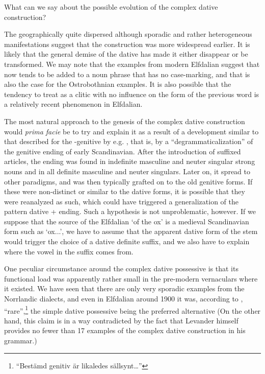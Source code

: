 What can we say about the possible evolution of the complex dative construction? 

The geographically quite dispersed although sporadic and rather heterogeneous manifestations suggest that the construction was more widespread earlier. It is likely that the general demise of the dative has made it either disappear or be transformed. We may note that the examples from modern Elfdalian suggest that now tends to be added to a noun phrase that has no case-marking, and that is also the case for the Ostrobothnian examples. It is also possible that the tendency to treat  as a clitic with no influence on the form of the previous word is a relatively recent phenomenon in Elfdalian.  

The most natural approach to the genesis of the complex dative construction would \textit{prima facie} be to try and explain it as a result of a development similar to that described for the -genitive by e.g. \citet{Norde1997}, that is, by a “degrammaticalization” of the genitive ending of early Scandinavian. After the introduction of suffixed articles, the ending was found in indefinite masculine and neuter singular strong nouns and in all definite masculine and neuter singulars. Later on, it spread to other paradigms, and was then typically grafted on to the old genitive forms. If these were non-distinct or similar to the dative forms, it is possible that they were reanalyzed as such, which could have triggered a generalization of the pattern dative + ending. Such a hypothesis is not unproblematic, however. If we suppose that the source of the Elfdalian  ‘of the ox’ is a medieval Scandinavian form such as  ‘ox.{}.{\gen}.{\sg}’, we have to assume that the apparent dative form of the stem would trigger the choice of a dative definite suffix, and we also have to explain where the vowel in the suffix comes from. 

One peculiar circumstance around the complex dative possessive is that its functional load was apparently rather small in the pre-modern vernaculars where it existed. We have seen that there are only very sporadic examples from the Norrlandic dialects, and even in Elfdalian around 1900 it was, according to \citet[98--99]{Levander1909}, “rare”,\footnote{ “Bestämd genitiv är likaledes sällsynt…”} the simple dative possessive being the preferred alternative (On the other hand, this claim is in a way contradicted by the fact that Levander himself provides no fewer than 17 examples of the complex dative construction in his grammar.) 

